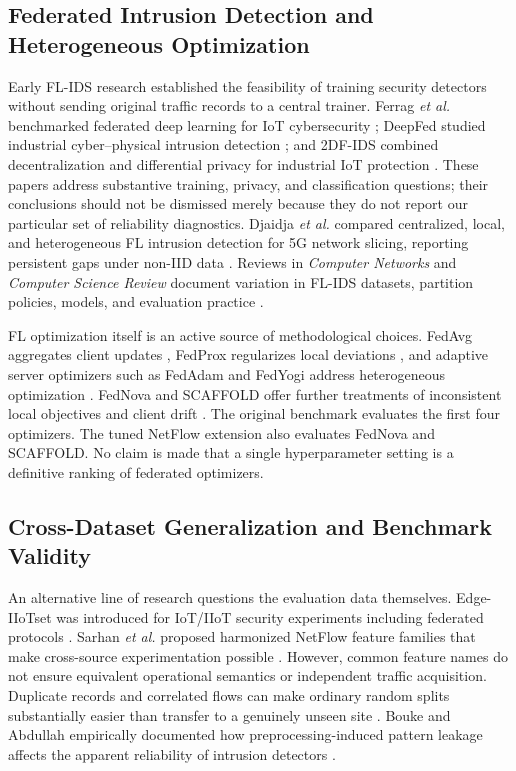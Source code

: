 \documentclass[journal,10pt]{IEEEtran}
\begin{document}
\subsection{Federated Intrusion Detection and Heterogeneous Optimization}
Early FL-IDS research established the feasibility of training security detectors without sending original traffic records to a central trainer. Ferrag \emph{et al.} benchmarked federated deep learning for IoT cybersecurity \cite{ferrag2021}; DeepFed studied industrial cyber--physical intrusion detection \cite{deepfed2021}; and 2DF-IDS combined decentralization and differential privacy for industrial IoT protection \cite{friha2023}. These papers address substantive training, privacy, and classification questions; their conclusions should not be dismissed merely because they do not report our particular set of reliability diagnostics. Djaidja \emph{et al.} compared centralized, local, and heterogeneous FL intrusion detection for 5G network slicing, reporting persistent gaps under non-IID data \cite{djaidja2024}. Reviews in \emph{Computer Networks} and \emph{Computer Science Review} document variation in FL-IDS datasets, partition policies, models, and evaluation practice \cite{belenguer2025,makris2025}.

FL optimization itself is an active source of methodological choices. FedAvg aggregates client updates \cite{mcmahan2017}, FedProx regularizes local deviations \cite{li2020}, and adaptive server optimizers such as FedAdam and FedYogi address heterogeneous optimization \cite{reddi2021}. FedNova and SCAFFOLD offer further treatments of inconsistent local objectives and client drift \cite{wang2020,karimireddy2020}. The original benchmark evaluates the first four optimizers. The tuned NetFlow extension also evaluates FedNova and SCAFFOLD. No claim is made that a single hyperparameter setting is a definitive ranking of federated optimizers.

\subsection{Cross-Dataset Generalization and Benchmark Validity}
An alternative line of research questions the evaluation data themselves. Edge-IIoTset was introduced for IoT/IIoT security experiments including federated protocols \cite{ferrag2022}. Sarhan \emph{et al.} proposed harmonized NetFlow feature families that make cross-source experimentation possible \cite{sarhan2021,sarhan2022,sarhan2022b}. However, common feature names do not ensure equivalent operational semantics or independent traffic acquisition. Duplicate records and correlated flows can make ordinary random splits substantially easier than transfer to a genuinely unseen site \cite{arp2022,pendlebury2019}. Bouke and Abdullah empirically documented how preprocessing-induced pattern leakage affects the apparent reliability of intrusion detectors \cite{bouke2023}.
\end{document}
